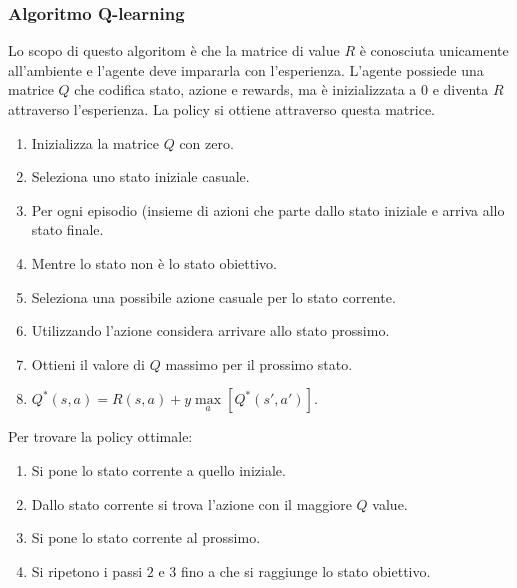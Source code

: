 		\subsubsection{Algoritmo Q-learning}
		Lo scopo di questo algoritom \`e che la matrice di value $R$ \`e conosciuta unicamente all'ambiente e l'agente deve impararla con l'esperienza.
		L'agente possiede una matrice $Q$ che codifica stato, azione e rewards, ma \`e inizializzata a $0$ e diventa $R$ attraverso l'esperienza.
		La policy si ottiene attraverso questa matrice.
		\begin{enumerate}
			\item Inizializza la matrice $Q$ con zero.
			\item Seleziona uno stato iniziale casuale.
			\item Per ogni episodio (insieme di azioni che parte dallo stato iniziale e arriva allo stato finale.
			\item Mentre lo stato non \`e lo stato obiettivo.
			\item Seleziona una possibile azione casuale per lo stato corrente.
			\item Utilizzando l'azione considera arrivare allo stato prossimo.
			\item Ottieni il valore di $Q$ massimo per il prossimo stato.
			\item $Q^*(s,a) = R(s,a)+y\max\limits_a[Q^*(s',a')]$.
		\end{enumerate}
		Per trovare la policy ottimale:
		\begin{enumerate}
			\item Si pone lo stato corrente a quello iniziale.
			\item Dallo stato corrente si trova l'azione con il maggiore $Q$ value.
			\item Si pone lo stato corrente al prossimo.
			\item Si ripetono i passi $2$ e $3$ fino a che si raggiunge lo stato obiettivo.
		\end{enumerate}

